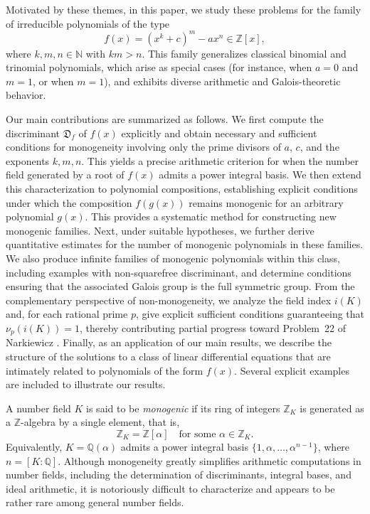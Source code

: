 \documentclass[table]{amsart}
\newcommand{\D}{\mathfrak{D}}
\numberwithin{equation}{section}
\begin{document}
\medskip

Motivated by these themes, in this paper, we study these problems for the family of irreducible polynomials of the type
\[
f(x)=(x^k+c)^m-ax^n\in\mathbb{Z}[x],
\]
where $k,m,n\in\mathbb{N}$ with $km > n$.
This family generalizes classical binomial and trinomial polynomials, which arise as special cases (for instance, when $a=0$ and $m=1$, or when $m=1$), and exhibits diverse arithmetic and Galois-theoretic behavior.


Our main contributions are summarized as follows.
We first compute the discriminant $\D_f$ of $f(x)$ explicitly and obtain necessary and sufficient conditions for monogeneity involving only the prime divisors of $a$, $c$, and the exponents $k,m,n$. 
 This yields a precise arithmetic criterion for when the number field generated by a root of $f(x)$ admits a power integral basis.
We then extend this characterization to polynomial compositions, establishing explicit conditions under which the composition $f(g(x))$ remains monogenic for an arbitrary polynomial $g(x)$. This provides a systematic method for constructing new monogenic families.
Next, under suitable hypotheses, we further derive quantitative estimates for the number of monogenic polynomials in these families. We also produce infinite families of monogenic polynomials within this class, including examples with non-squarefree discriminant, and determine conditions ensuring that the associated Galois group is the full symmetric group. 
From the complementary perspective of non-monogeneity, we analyze the field index $i(K)$ and, for each rational prime $p$, give explicit sufficient conditions guaranteeing that $\nu_p(i(K))=1$, thereby contributing partial progress toward Problem~22 of Narkiewicz \cite{Narkiewicz2004}.
Finally, as an application of our main results, we describe the structure of the solutions to a class of linear differential equations that are intimately related to polynomials of the form $f(x)$.
Several explicit examples are included to illustrate our results.








\iffalse


A number field $K$ is said to be \emph{monogenic} if its ring of integers $\mathbb{Z}_K$ is generated as a $\mathbb{Z}$-algebra by a single element, that is,
\[
\mathbb{Z}_K=\mathbb{Z}[\alpha]\quad \text{for some } \alpha\in\mathbb{Z}_K.
\]
Equivalently, $K=\mathbb{Q}(\alpha)$ admits a power integral basis $\{1,\alpha,\dots,\alpha^{n-1}\}$, where $n=[K:\mathbb{Q}]$.
Although monogeneity greatly simplifies arithmetic computations in number fields, including the determination of discriminants, integral bases, and ideal arithmetic, it is notoriously difficult to characterize and appears to be rather rare among general number fields.
\end{document}

